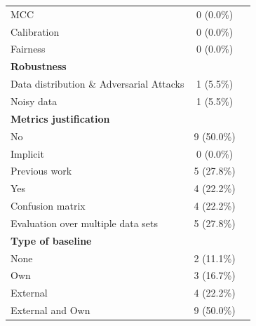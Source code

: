 \documentclass[a4paper]{article}
\begin{document}
\begin{appendices}
\begin{table}[ht]
\begin{tabularx}{\textwidth}{|l|c|X|}
		\hspace{3mm} MCC & 0 (0.0\%) & \\
		Calibration & 0 (0.0\%) &  \\
		Fairness &  0 (0.0\%) &  \\
		\textbf{Robustness} &  & \\
		\hspace{3mm} Data distribution \& Adversarial Attacks & 1 (5.5\%) & \cite{10586831} \\
		\hspace{3mm} Noisy data & 1 (5.5\%) & \cite{10.1145/3597503.3639217} \\
		\textbf{Metrics justification} & & \\
		\hspace{3mm} No & 9 (50.0\%) & \cite{10.1145/3597503.3639217,10.1145/3597503.3639117,10.1145/3597503.3639194,10.1145/3597503.3639202,10.1145/3663529.3663785,10.1145/3663529.3663794,10323231,10586831,10599336}\\
		\hspace{3mm} Implicit & 0 (0.0\%) &  \\
		\hspace{3mm} Previous work & 5 (27.8\%) & \cite{10402095,10659742,10746847,10.1145/3597503.3639216,10.1145/3597503.3623322}\\
		\hspace{3mm} Yes & 4 (22.2\%) & \cite{10.1145/3597503.3623345,10.1145/3597503.3623304,10648982,10704582} \\
		Confusion matrix & 4 (22.2\%) & \cite{10.1145/3597503.3639117,10.1145/3663529.3663794,10648982,10659742}\\
		Evaluation over multiple data sets & 5 (27.8\%) & \cite{10.1145/3597503.3639117,10402095,10648982,10.1145/3597503.3639216,10.1145/3597503.3623322}\\
		\textbf{Type of baseline} &&\\
		\hspace{3mm} None & 2 (11.1\%) & \cite{10.1145/3597503.3639117,10.1145/3663529.3663794} \\
		\hspace{3mm} Own & 3 (16.7\%) & \cite{10.1145/3597503.3639194,10.1145/3663529.3663785,10704582} \\
		\hspace{3mm} External & 4 (22.2\%) & \cite{10.1145/3597503.3623304,10402095,10599336,10.1145/3597503.3623322}  \\
		\hspace{3mm} External and Own & 9 (50.0\%) & \cite{10.1145/3597503.3623345,10.1145/3597503.3639217,10.1145/3597503.3639202,10323231,10586831,10648982,10659742,10746847,10.1145/3597503.3639216}\\

\end{tabularx}
\end{table}
\end{appendices}
\end{document}
